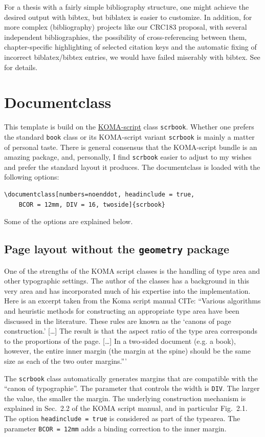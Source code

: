 For a thesis with a fairly simple bibliography structure, one might achieve the desired output with bibtex, but biblatex is easier to customize. In addition, for more complex (bibliography) projects like our CRC183 proposal, with several independent bibliographies, the possibility of cross-referencing between them, chapter-specific highlighting of selected citation keys and the automatic fixing of incorrect biblatex/bibtex entries, we would have failed miserably with bibtex.
See  for details.



\section{Documentclass}
This template is build on the \href{https://ctan.org/pkg/koma-script?lang=de}{KOMA-script} class \verb|scrbook|. 
Whether one prefers the standard \verb|book| class or its KOMA-script variant \verb|scrbook| is mainly a matter of personal taste. There is general consensus that the KOMA-script bundle is an amazing package, and, personally, I find \verb|scrbook| easier to adjust to my wishes and prefer the standard layout it produces. 
The documentclass is loaded with the following options:
\begin{lstlisting}
\documentclass[numbers=noenddot, headinclude = true,
	BCOR = 12mm, DIV = 16, twoside]{scrbook}
\end{lstlisting}
Some of the options are explained below.

\subsection{Page layout without the \texttt{geometry} package}
One of the strengths of the KOMA script classes is the handling of type area and other typographic settings. The author of the classes has a background in this very area and has incorporated much of his expertise into the implementation. Here is an excerpt taken from the Koma script manual CITe: ``Various algorithms and heuristic methods for constructing an appropriate type area have been discussed in the literature. These rules are known as the `canons of page construction.' [\ldots] The result is that the
aspect ratio of the type area corresponds to the proportions of the page. [\ldots] In a two-sided document (e.g. a book), however, the entire inner margin (the margin at the spine) should be the same size as each of the two outer margins.'''

The \verb|scrbook| class automatically generates margins that are compatible with the ``canon of typographie''. The parameter that controls the width is \verb|DIV|. The larger the value, the smaller the margin. The underlying construction mechanism is explained in  
Sec.~2.2 of the KOMA script manual, and in particular Fig.~2.1.
The option \verb|headinclude = true| is considered as part of the typearea. The parameter \verb|BCOR = 12mm| adds a binding correction to the inner margin.

